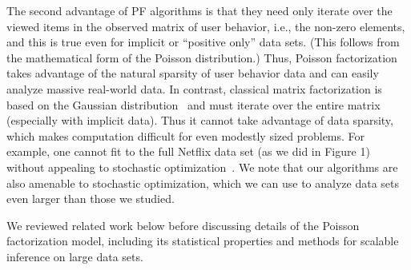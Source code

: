 The second advantage of PF algorithms is that they need only iterate
over the viewed items in the observed matrix of user behavior, i.e.,
the non-zero elements, and this is true even for implicit or
``positive only'' data sets.  (This follows from the mathematical form
of the Poisson distribution.)  Thus, Poisson factorization takes
advantage of the natural sparsity of user behavior data and can easily
analyze massive real-world data. In contrast, classical matrix
factorization is based on the Gaussian
distribution~\cite{Salakhutdinov:2008} and must iterate over the
entire matrix (especially with implicit data).  Thus it cannot take
advantage of data sparsity, which makes computation difficult for even
modestly sized problems.  For example, one cannot fit to the full
Netflix data set (as we did in Figure 1) without appealing to
stochastic optimization~\cite{Mairal:2010}.  We note that our
algorithms are also amenable to stochastic optimization, which we can
use to analyze data sets even larger than those we studied.


We reviewed related work below before discussing details of the
Poisson factorization model, including its statistical properties and
methods for scalable inference on large data sets.

